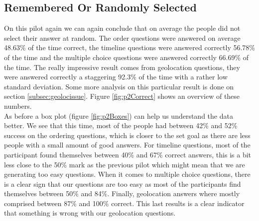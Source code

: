 \subsection{Remembered Or Randomly Selected}\label{sec:p2remem}
On this pilot again we can again conclude that on average the people did not select their answer at random. The order questions were answered on average 48.63\% of the time correct, the timeline questions were answered correctly 56.78\% of the time and the multiple choice questions were answered correctly 66.69\% of the time. The really impressive result comes from geolocation questions, they were answered correctly a staggering 92.3\% of the time with a rather low standard deviation. Some more analysis on this particular result is done on section \ref{subsec:geolocissue}. Figure \ref{fig:p2Correct} shows an overview of these numbers.\\
As before a box plot (figure \ref{fig:p2Boxes}) can help us understand the data better. We see that this time, most of the people had between 42\% and 52\% success on the ordering questions, which is closer to the set goal as there are less people with a small amount of good answers. For timeline questions, most of the participant found themselves between 40\% and 67\% correct answers, this is a bit less close to the 50\% mark as the previous pilot which might mean that we are generating too easy questions. When it comes to multiple choice questions, there is a clear sign that our questions are too easy as most of the participants find themselves between 50\% and 84\%. Finally, geolocation answers where mostly comprised between 87\% and 100\% correct. This last results is a clear indicator that something is wrong with our geolocation questions.

